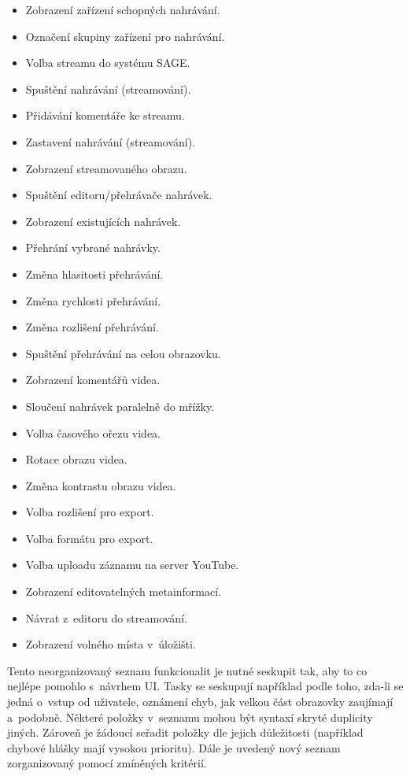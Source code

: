 \documentclass[thesis=M,czech]{FITthesis}[2012/06/26]
\begin{document}
\begin{itemize}
 \item Zobrazení zařízení schopných nahrávání.
 \item Označení skupiny zařízení pro nahrávání.
 \item Volba streamu do systému SAGE.
 \item Spuštění nahrávání (streamování).
 \item Přidávání komentáře ke streamu.
 \item Zastavení nahrávání (streamování).
 \item Zobrazení streamovaného obrazu.
 \item Spuštění editoru/přehrávače nahrávek.
 \item Zobrazení existujících nahrávek.
 \item Přehrání vybrané nahrávky.
 \item Změna hlasitosti přehrávání.
 \item Změna rychlosti přehrávání.
 \item Změna rozlišení přehrávání.
 \item Spuštění přehrávání na celou obrazovku.
 \item Zobrazení komentářů videa.
 \item Sloučení nahrávek paralelně do mřížky.
 \item Volba časového ořezu videa.
 \item Rotace obrazu videa.
 \item Změna kontrastu obrazu videa.
 \item Volba rozlišení pro export.
 \item Volba formátu pro export.
 \item Volba uploadu záznamu na server YouTube.
 \item Zobrazení editovatelných metainformací.
 \item Návrat z~editoru do streamování.
 \item Zobrazení volného místa v~úložišti.
\end{itemize}

Tento neorganizovaný seznam funkcionalit je nutné seskupit tak, aby to co nejlépe pomohlo s~návrhem UI. Tasky se seskupují například podle toho, zda-li se jedná o~vstup od uživatele, oznámení chyb, jak velkou část obrazovky zaujímají a~podobně. Některé položky v~seznamu mohou být syntaxí skryté duplicity jiných. Zároveň je žádoucí seřadit položky dle jejich důležitosti (například chybové hlášky mají vysokou prioritu). Dále je uvedený nový seznam zorganizovaný pomocí zmíněných kritérií.
\end{document}
